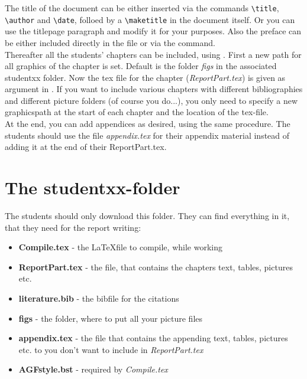 \documentclass[12pt,a4paper,notitlepage]{scrreprt}
\begin{document}
The title of the document can be either inserted via the commands \verb#\title#, \verb#\author# and \verb#\date#, folloed by a \verb#\maketitle# in the document itself. Or you can use the titlepage paragraph and modify it for your purposes. Also the preface can be either included directly in the file or via the \verb## command.\\

Thereafter all the students' chapters can be included, using \verb##. First a new path for all graphics of the chapter is set. Default is the folder \textit{figs} in the associated studentxx folder. Now the tex file for the chapter (\textit{ReportPart.tex}) is given as argument in \verb##.
If you want to include various chapters with different bibliographies and different picture folders (of course you do...), you only need to specify a new graphicspath at the start of each chapter and the location of the tex-file.\\

At the end, you can add appendices as desired, using the same procedure. The students should use the file \textit{appendix.tex} for their appendix material instead of adding it at the end of their ReportPart.tex.


\section{The studentxx-folder}\label{sec:studx}

The students should only download this folder. They can find everything in it, that they need for the report writing:

\begin{itemize}
	\item \textbf{Compile.tex} - the \LaTeX file to compile, while working
	\item \textbf{ReportPart.tex} - the file, that contains the chapters text, tables, pictures etc.
	\item \textbf{literature.bib} - the bibfile for the citations
	\item \textbf{figs} - the folder, where to put all your picture files
	\item \textbf{appendix.tex} - the file that contains the appending text, tables, pictures etc. to you don't want to include in \textit{ReportPart.tex}
	\item \textbf{AGFstyle.bst} - required by \textit{Compile.tex}
\end{itemize}
\end{document}
